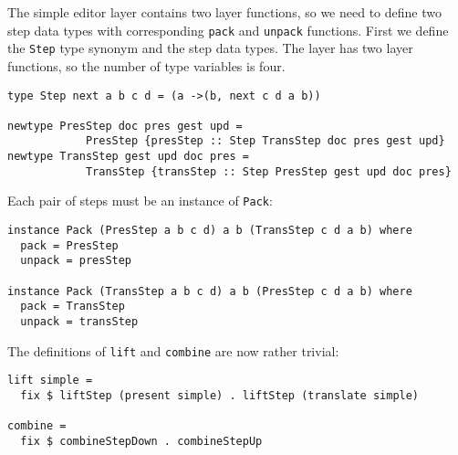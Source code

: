 \par The simple editor layer contains two layer functions, so we need to
        define two step data types with corresponding \texttt{pack} and \texttt{unpack}
        functions. First we define the \texttt{Step} type synonym and the step data
        types. The layer has two layer functions, so the number of type variables is
        four.\begin{small}\begin{verbatim}type Step next a b c d = (a ->(b, next c d a b))

newtype PresStep doc pres gest upd = 
            PresStep {presStep :: Step TransStep doc pres gest upd}
newtype TransStep gest upd doc pres = 
            TransStep {transStep :: Step PresStep gest upd doc pres}\end{verbatim}\end{small}

\par Each pair of steps must be an instance of \texttt{Pack}: \begin{small}\begin{verbatim}instance Pack (PresStep a b c d) a b (TransStep c d a b) where
  pack = PresStep
  unpack = presStep

instance Pack (TransStep a b c d) a b (PresStep c d a b) where
  pack = TransStep
  unpack = transStep\end{verbatim}\end{small}

\par The definitions of \texttt{lift} and \texttt{combine} are now rather
        trivial:\begin{small}\begin{verbatim}lift simple =
  fix $ liftStep (present simple) . liftStep (translate simple)

combine = 
  fix $ combineStepDown . combineStepUp\end{verbatim}\end{small}

